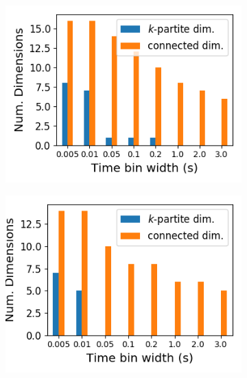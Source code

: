\documentclass[a4paper,12pt]{article}
\theoremstyle{definition}
\begin{document}
  \begin{figure}[h]
    \begin{subfigure}[h]{0.5\linewidth}
      \centering
      \includegraphics[width=\linewidth]{figures/Krebs_rectified_total_structure_dims.png}
      \label{fig:Krebs_rectified_total_structure_dims}
    \end{subfigure}
    \begin{subfigure}[h]{0.5\linewidth}
      \centering
      \includegraphics[width=\linewidth]{figures/Waksman_rectified_total_structure_dims.png}
      \label{fig:Waksman_rectified_total_structure_dims}
    \end{subfigure}
    \begin{subfigure}[h]{0.5\linewidth}

\end{subfigure}
\end{figure}
\end{document}
